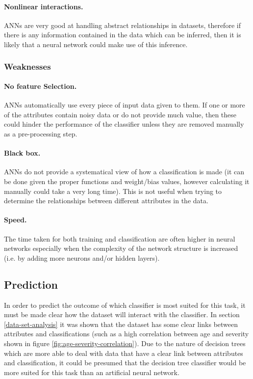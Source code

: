 \documentclass[12pt]{article}
\begin{document}
      \paragraph{Nonlinear interactions.}
        ANNs are very good at handling abstract relationships in datasets, therefore if there is any information contained in the data which can be inferred, then it is likely that a neural network could make use of this inference.

    \subsubsection{Weaknesses}
      \paragraph{No feature Selection.}
        ANNs automatically use every piece of input data given to them. If one or more of the attributes contain noisy data or do not provide much value, then these could hinder the performance of the classifier unless they are removed manually as a pre-processing step.

      \paragraph{Black box.}
        ANNs do not provide a systematical view of how a classification is made (it can be done given the proper functions and weight/bias values, however calculating it manually could take a very long time). This is not useful when trying to determine the relationships between different attributes in the data.

      \paragraph{Speed.}
        The time taken for both training and classification are often higher in neural networks especially when the complexity of the network structure is increased (i.e. by adding more neurons and/or hidden layers).

  \subsection{Prediction}
    In order to predict the outcome of which classifier is most suited for this task, it must be made clear how the dataset will interact with the classifier.
    In section \ref{data-set-analysis} it was shown that the dataset has some clear links between attributes and classifications (such as a high correlation between age and severity shown in figure \ref{fig:age-severity-correlation}). Due to the nature of decision trees which are more able to deal with data that have a clear link between attributes and classification, it could be presumed that the decision tree classifier would be more suited for this task than an artificial neural network.
\end{document}
